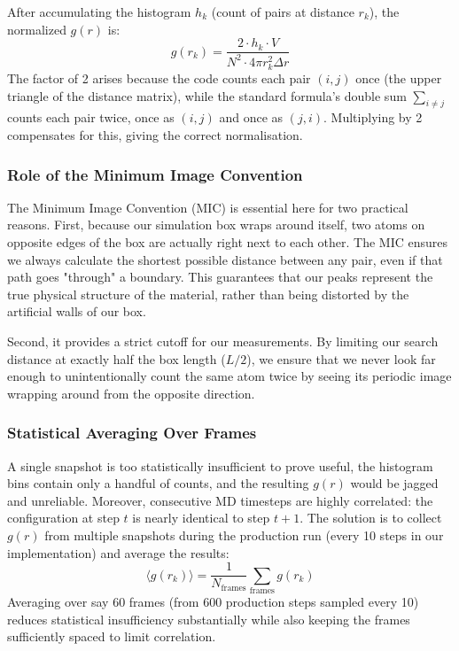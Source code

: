 After accumulating the histogram $h_k$ (count of pairs at distance $r_k$), the normalized $g(r)$ is:
\begin{equation}
    g(r_k) = \frac{2 \cdot h_k \cdot V}{N^2 \cdot 4\pi r_k^2 \Delta r}
    \label{eq:gr_norm}
\end{equation}
The factor of 2 arises because the code counts each pair $(i, j)$ once (the upper triangle of the distance matrix), while the standard formula's double sum $\sum_{i \neq j}$ counts each pair twice, once as $(i,j)$ and once as $(j, i)$. Multiplying by 2 compensates for this, giving the correct normalisation.

\subsubsection{Role of the Minimum Image Convention}

The Minimum Image Convention (MIC) is essential here for two practical reasons. First, because our simulation box wraps around itself, two atoms on opposite edges of the box are actually right next to each other. The MIC ensures we always calculate the shortest possible distance between any pair, even if that path goes "through" a boundary. This guarantees that our peaks represent the true physical structure of the material, rather than being distorted by the artificial walls of our box. 

Second, it provides a strict cutoff for our measurements. By limiting our search distance at exactly half the box length ($L/2$), we ensure that we never look far enough to unintentionally count the same atom twice by seeing its periodic image wrapping around from the opposite direction.
\subsubsection{Statistical Averaging Over Frames}

A single snapshot is too statistically insufficient to prove useful, the histogram bins contain only a handful of counts, and the resulting $g(r)$ would be jagged and unreliable. Moreover, consecutive MD timesteps are highly correlated: the configuration at step $t$ is nearly identical to step $t+1$. The solution is to collect $g(r)$ from multiple snapshots during the production run (every 10 steps in our implementation) and average the results:
\begin{equation}
    \langle g(r_k) \rangle = \frac{1}{N_\text{frames}} \sum_{\text{frames}} g(r_k)
    \label{eq:gr_avg}
\end{equation}
Averaging over say 60 frames (from 600 production steps sampled every 10) reduces statistical insufficiency substantially while also keeping the frames sufficiently spaced to limit correlation.

